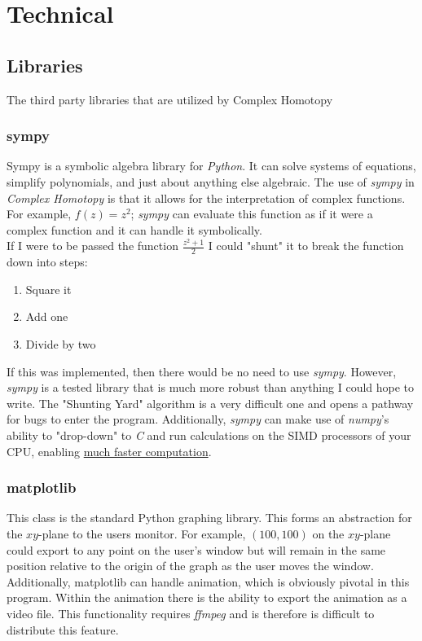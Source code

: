\documentclass{article}
\begin{document}
\section{Technical}
    \subsection{Libraries}
    The third party libraries that are utilized by Complex Homotopy
        \subsubsection{sympy}
        Sympy is a symbolic algebra library for \textit{Python}. It can solve systems of equations, simplify polynomials, and just about anything else algebraic. The use of \textit{sympy} in \textit{Complex Homotopy} is that it allows for the interpretation of complex functions. For example, $f(z) = z^{2}$; \textit{sympy} can evaluate this function as if it were a complex function and it can handle it symbolically.\\
        If I were to be passed the function $\frac{z^{2} + 1}{2}$ I could "shunt" it to break the function down into steps:
        \begin{enumerate}
            \item Square it
            \item Add one
            \item Divide by two
        \end{enumerate}
        If this was implemented, then there would be no need to use \textit{sympy}. However, \textit{sympy} is a tested library that is much more robust than anything I could hope to write. The "Shunting Yard" algorithm is a very difficult one and opens a pathway for bugs to enter the program. Additionally, \textit{sympy} can make use of \textit{numpy}'s ability to "drop-down" to \textit{C} and run calculations on the SIMD processors of your CPU, enabling  \href{http://docs.sympy.org/dev/modules/numeric-computation.html}{much faster computation}.
        \subsubsection{matplotlib}
        This class is the standard Python graphing library. This forms an abstraction for the $xy$-plane to the users monitor. For example, $(100,100)$ on the $xy$-plane could export to any point on the user's window but will remain in the same position relative to the origin of the graph as the user moves the window. Additionally, matplotlib can handle animation, which is obviously pivotal in this program. Within the animation there is the ability to export the animation as a video file. This functionality requires \textit{ffmpeg} and is therefore is difficult to distribute this feature.
\end{document}
